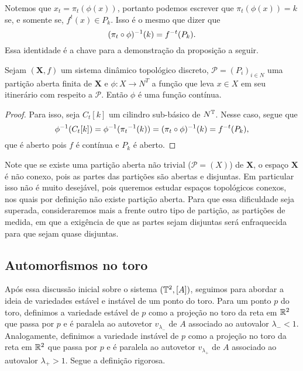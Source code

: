 Notemos que $x_t = \pi_t(\phi(x))$, portanto podemos escrever que $\pi_t(\phi(x)) = k$ se, e somente se, $f^t(x) \in P_k$. Isso é o mesmo que dizer que
	\begin{equation*}
	(\pi_t \circ \phi)^{-1}(k) = f^{-t}(P_k).
	\end{equation*}
Essa identidade é a chave para a demonstração da proposição a seguir.

\begin{proposition}
Sejam $(\bm X,f)$ um sistema dinâmico topológico discreto, $\mathcal P=(P_i)_{i \in N}$ uma partição aberta finita de $\bm X$ e $\phi: X \to N^T$ a função que leva $x \in X$ em seu itinerário com respeito a $\mathcal{P}$. Então $\phi$ é uma função contínua.
\end{proposition}
\begin{proof}
Para isso, seja $C_t[k]$ um cilindro sub-básico de $N^{\mathbb{T}}$. Nesse caso, segue que
	\begin{equation*}
	\phi^{-1}(C_t[k]) = \phi^{-1}({\pi_t}^{-1}(k)) = (\pi_t \circ \phi)^{-1}(k) = f^{-t}(P_k),
	\end{equation*}
que é aberto pois $f$ é contínua e $P_k$ é aberto.
\end{proof}

Note que se existe uma partição aberta não trivial ($\mathcal{P}=(X)$) de $\bm X$, o espaço $\bm X$ é não conexo, pois as partes das partições são abertas e disjuntas. Em particular isso não é muito desejável, pois queremos estudar espaços topológicos conexos, nos quais por definição não existe partição aberta. Para que essa dificuldade seja superada, consideraremos mais a frente outro tipo de partição, as partições de medida, em que a exigência de que as partes sejam disjuntas será enfraquecida para que sejam quase disjuntas.


\subsection{Automorfismos no toro}

Após essa discussão inicial sobre o sistema $(\mathbb{T}^2, [A])$, seguimos para abordar a ideia de variedades estável e instável de um ponto do toro. Para um ponto $p$ do toro, definimos a variedade estável de $p$ como a projeção no toro da reta em $\mathbb{R}^2$ que passa por $p$ e é paralela ao autovetor $v_{\lambda_-}$ de $A$ associado ao autovalor $\lambda_- < 1$. Analogamente, definimos a variedade instável de $p$ como a projeção no toro da reta em $\mathbb{R}^2$ que passa por $p$ e é paralela ao autovetor $v_{\lambda_+}$ de $A$ associado ao autovalor $\lambda_+ > 1$. Segue a definição rigorosa.

